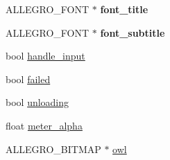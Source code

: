 \begin{DoxyCompactItemize}
\item 
\hypertarget{structLevel1Resources_a9b78bde7eb3c5f32d8a5b0882c4a7cfc}{A\+L\+L\+E\+G\+R\+O\+\_\+\+F\+O\+N\+T $\ast$ {\bfseries font\+\_\+title}}\label{structLevel1Resources_a9b78bde7eb3c5f32d8a5b0882c4a7cfc}

\item 
\hypertarget{structLevel1Resources_aca6a20a07e2b3711b38c9c4f2f4f0dbe}{A\+L\+L\+E\+G\+R\+O\+\_\+\+F\+O\+N\+T $\ast$ {\bfseries font\+\_\+subtitle}}\label{structLevel1Resources_aca6a20a07e2b3711b38c9c4f2f4f0dbe}

\item 
bool \hyperlink{structLevel1Resources_a008084a2ce8c21034bbd60b704e45498}{handle\+\_\+input}
\item 
bool \hyperlink{structLevel1Resources_a78f735228eaebbd7cbb90ebc554c88d7}{failed}
\item 
bool \hyperlink{structLevel1Resources_a646f78b5f30adf8f93e114cad75f250d}{unloading}
\item 
float \hyperlink{structLevel1Resources_ae5774909dd3a4fe04fb93fe3d20b791e}{meter\+\_\+alpha}
\item 
A\+L\+L\+E\+G\+R\+O\+\_\+\+B\+I\+T\+M\+A\+P $\ast$ \hyperlink{structLevel1Resources_aa9b6f6612cbc7a39ce78c8becfe5974f}{owl}
\end{DoxyCompactItemize}


